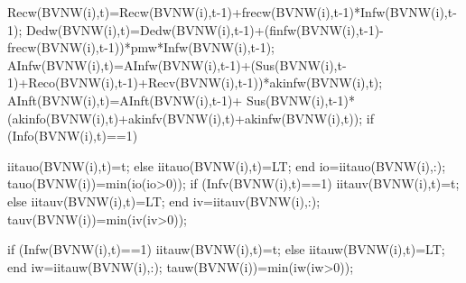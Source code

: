                                           Recw(BVNW(i),t)=Recw(BVNW(i),t-1)+frecw(BVNW(i),t-1)*Infw(BVNW(i),t-1);
                                          Dedw(BVNW(i),t)=Dedw(BVNW(i),t-1)+(finfw(BVNW(i),t-1)-frecw(BVNW(i),t-1))*pmw*Infw(BVNW(i),t-1);
                                          AInfw(BVNW(i),t)=AInfw(BVNW(i),t-1)+(Sus(BVNW(i),t-1)+Reco(BVNW(i),t-1)+Recv(BVNW(i),t-1))*akinfw(BVNW(i),t);                                           
                                          AInft(BVNW(i),t)=AInft(BVNW(i),t-1)+ Sus(BVNW(i),t-1)*(akinfo(BVNW(i),t)+akinfv(BVNW(i),t)+akinfw(BVNW(i),t));
                                          if (Info(BVNW(i),t)==1)
                                             
                                              iitauo(BVNW(i),t)=t;                                              
                                          else
                                              iitauo(BVNW(i),t)=LT;
                                          end
                                          io=iitauo(BVNW(i),:);
                                          tauo(BVNW(i))=min(io(io>0));
                                          if (Infv(BVNW(i),t)==1)                                              
                                              iitauv(BVNW(i),t)=t;                                           
                                          else
                                              iitauv(BVNW(i),t)=LT;                                             
                                          end
                                          iv=iitauv(BVNW(i),:);
                                          tauv(BVNW(i))=min(iv(iv>0));
                                          
                                          if (Infw(BVNW(i),t)==1)                                              
                                              iitauw(BVNW(i),t)=t;                                           
                                          else
                                              iitauw(BVNW(i),t)=LT;                                             
                                          end
                                          iw=iitauw(BVNW(i),:);
                                          tauw(BVNW(i))=min(iw(iw>0));
                                          
